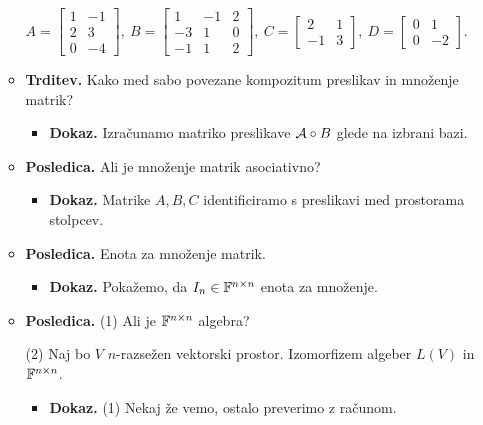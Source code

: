 \begin{enumerate}
\begin{itemize}
        $A = \begin{bmatrix}
            1 & -1 \\
            2 & 3 \\
            0 & -4
        \end{bmatrix}, \ B = \begin{bmatrix}
            1 & -1 & 2 \\
            -3 & 1 & 0 \\
            -1 & 1 & 2
        \end{bmatrix}, \ C = \begin{bmatrix}
            2 & 1 \\
            -1 & 3
        \end{bmatrix}, \ D = \begin{bmatrix}
            0 & 1 \\
            0 & -2
        \end{bmatrix}$.
        \item \colorbox{blue!30}{\textbf{Trditev.}} Kako med sabo povezane kompozitum preslikav in množenje matrik?
        \begin{itemize}
            \item \colorbox{green!30}{\textbf{Dokaz.}} Izračunamo matriko preslikave $\mathcal{A} \circ B$ glede na izbrani bazi.
        \end{itemize}  
        \item \colorbox{orange!30}{\textbf{Posledica.}} Ali je množenje matrik asociativno?
        \begin{itemize}
            \item \colorbox{green!30}{\textbf{Dokaz.}} Matrike $A, B, C$ identificiramo s preslikavi med prostorama stolpcev.
        \end{itemize}  
        \item \colorbox{orange!30}{\textbf{Posledica.}} Enota za množenje matrik.
        \begin{itemize}
            \item \colorbox{green!30}{\textbf{Dokaz.}} Pokažemo, da $I_n \in \mathbb{F}^{n \times n}$ enota za množenje.
        \end{itemize}  
        \item \colorbox{orange!30}{\textbf{Posledica.}} (1) Ali je $\mathbb{F}^{n \times n}$ algebra?
        
        (2) Naj bo $V$ $n$-razsežen vektorski prostor. Izomorfizem algeber $L(V)$ in $\mathbb{F}^{n \times n}$.
        \begin{itemize}
            \item \colorbox{green!30}{\textbf{Dokaz.}} (1) Nekaj že vemo, ostalo preverimo z računom.
            

\end{itemize}
\end{itemize}
\end{enumerate}
